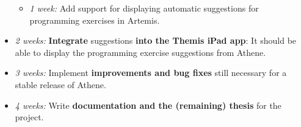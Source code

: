 \begin{itemize}
\begin{itemize}
        \item \textit{1 week:} Add support for displaying automatic suggestions for programming exercises in Artemis.
    \end{itemize}
    \item \textit{2 weeks:} \textbf{Integrate} suggestions \textbf{into the Themis iPad app}: It should be able to display the programming exercise suggestions from Athene.
    \item \textit{3 weeks:} Implement \textbf{improvements and bug fixes} still necessary for a stable release of Athene.
    \item \textit{4 weeks:} Write \textbf{documentation and the (remaining) thesis} for the project.
\end{itemize}


\clearpage

\clearpage




